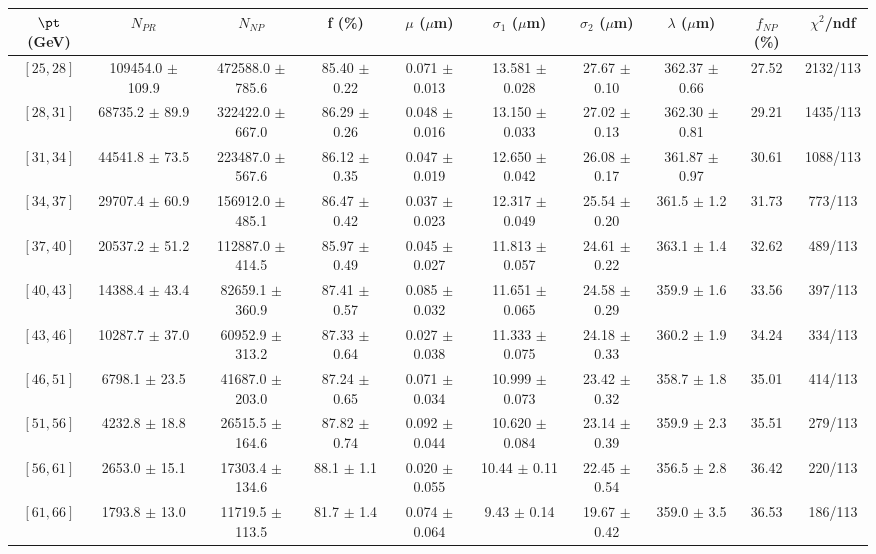 \begin{tabular}{c||c|c|c|c|c|c|c||c|c}
$\pt$ (GeV) & $N_{PR}$ & $N_{NP}$ & f (\%) & $\mu$ ($\mu$m) & $\sigma_1$ ($\mu$m) & $\sigma_2$ ($\mu$m)  & $\lambda$ ($\mu$m) & $f_{NP}$ (\%) & $\chi^2$/ndf \\
\hline
$[25, 28]$ & 109454.0 $\pm$ 109.9 & 472588.0 $\pm$ 785.6 & 85.40 $\pm$ 0.22 & 0.071 $\pm$ 0.013 & 13.581 $\pm$ 0.028 & 27.67 $\pm$ 0.10 & 362.37 $\pm$ 0.66 & 27.52 & 2132/113\\
$[28, 31]$ & 68735.2 $\pm$ 89.9 & 322422.0 $\pm$ 667.0 & 86.29 $\pm$ 0.26 & 0.048 $\pm$ 0.016 & 13.150 $\pm$ 0.033 & 27.02 $\pm$ 0.13 & 362.30 $\pm$ 0.81 & 29.21 & 1435/113\\
$[31, 34]$ & 44541.8 $\pm$ 73.5 & 223487.0 $\pm$ 567.6 & 86.12 $\pm$ 0.35 & 0.047 $\pm$ 0.019 & 12.650 $\pm$ 0.042 & 26.08 $\pm$ 0.17 & 361.87 $\pm$ 0.97 & 30.61 & 1088/113\\
$[34, 37]$ & 29707.4 $\pm$ 60.9 & 156912.0 $\pm$ 485.1 & 86.47 $\pm$ 0.42 & 0.037 $\pm$ 0.023 & 12.317 $\pm$ 0.049 & 25.54 $\pm$ 0.20 & 361.5 $\pm$ 1.2 & 31.73 & 773/113\\
$[37, 40]$ & 20537.2 $\pm$ 51.2 & 112887.0 $\pm$ 414.5 & 85.97 $\pm$ 0.49 & 0.045 $\pm$ 0.027 & 11.813 $\pm$ 0.057 & 24.61 $\pm$ 0.22 & 363.1 $\pm$ 1.4 & 32.62 & 489/113\\
$[40, 43]$ & 14388.4 $\pm$ 43.4 & 82659.1 $\pm$ 360.9 & 87.41 $\pm$ 0.57 & 0.085 $\pm$ 0.032 & 11.651 $\pm$ 0.065 & 24.58 $\pm$ 0.29 & 359.9 $\pm$ 1.6 & 33.56 & 397/113\\
$[43, 46]$ & 10287.7 $\pm$ 37.0 & 60952.9 $\pm$ 313.2 & 87.33 $\pm$ 0.64 & 0.027 $\pm$ 0.038 & 11.333 $\pm$ 0.075 & 24.18 $\pm$ 0.33 & 360.2 $\pm$ 1.9 & 34.24 & 334/113\\
$[46, 51]$ & 6798.1 $\pm$ 23.5 & 41687.0 $\pm$ 203.0 & 87.24 $\pm$ 0.65 & 0.071 $\pm$ 0.034 & 10.999 $\pm$ 0.073 & 23.42 $\pm$ 0.32 & 358.7 $\pm$ 1.8 & 35.01 & 414/113\\
$[51, 56]$ & 4232.8 $\pm$ 18.8 & 26515.5 $\pm$ 164.6 & 87.82 $\pm$ 0.74 & 0.092 $\pm$ 0.044 & 10.620 $\pm$ 0.084 & 23.14 $\pm$ 0.39 & 359.9 $\pm$ 2.3 & 35.51 & 279/113\\
$[56, 61]$ & 2653.0 $\pm$ 15.1 & 17303.4 $\pm$ 134.6 & 88.1 $\pm$ 1.1 & 0.020 $\pm$ 0.055 & 10.44 $\pm$ 0.11 & 22.45 $\pm$ 0.54 & 356.5 $\pm$ 2.8 & 36.42 & 220/113\\
$[61, 66]$ & 1793.8 $\pm$ 13.0 & 11719.5 $\pm$ 113.5 & 81.7 $\pm$ 1.4 & 0.074 $\pm$ 0.064 & 9.43 $\pm$ 0.14 & 19.67 $\pm$ 0.42 & 359.0 $\pm$ 3.5 & 36.53 & 186/113\\

\end{tabular}
